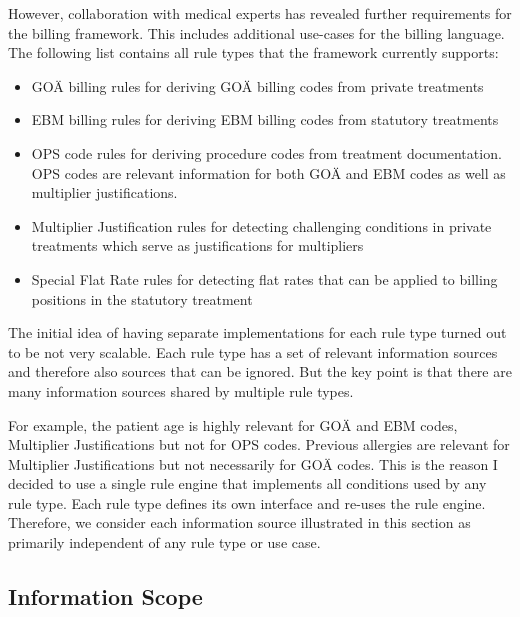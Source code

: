 However, collaboration with medical experts has revealed further requirements for the billing framework.
This includes additional use-cases for the billing language.
The following list contains all rule types that the framework currently supports:
\begin{itemize}
    \item GOÄ billing rules for deriving GOÄ billing codes from private treatments
    \item EBM billing rules for deriving EBM billing codes from statutory treatments
    \item OPS code rules for deriving procedure codes from treatment documentation.
    OPS codes are relevant information for both GOÄ and EBM codes as well as multiplier justifications.
    \item Multiplier Justification rules for detecting challenging conditions in private treatments
    which serve as justifications for multipliers
    \item Special Flat Rate rules
    for detecting flat rates that can be applied to billing positions in the statutory treatment
\end{itemize}

The initial idea of having separate implementations for each rule type turned out to be not very scalable.
Each rule type has a set of relevant information sources and therefore also sources that can be ignored.
But the key point is that there are many information sources shared by multiple rule types.

For example, the patient age is highly relevant for GOÄ and EBM codes, Multiplier Justifications but not for OPS codes.
Previous allergies are relevant for Multiplier Justifications but not necessarily for GOÄ codes.
This is the reason I decided to use a single rule engine that implements all conditions used by any rule type.
Each rule type defines its own interface and re-uses the rule engine.
Therefore,
we consider each information source illustrated in this section as primarily independent of any rule type or use case.

\subsection{Information Scope}

